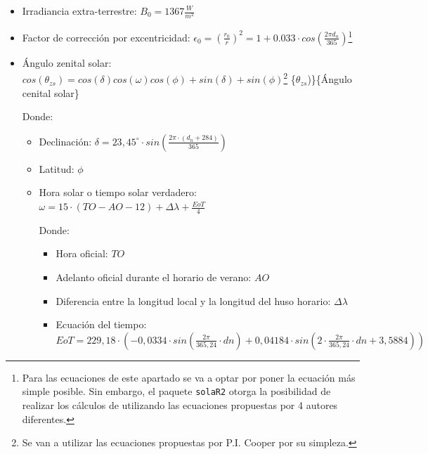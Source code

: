 \begin{itemize}
\item Irradiancia extra-terrestre: \(B_0=1367\frac{W}{m^2}\) 
\item Factor de corrección por excentricidad: \(\epsilon_0=(\frac{r_0}{r})^2=1+0.033\cdot cos(\frac{2\pi d_n}{365})\)\footnote{Para las ecuaciones de este apartado se va a optar por poner la ecuación más simple posible. Sin embargo, el paquete \texttt{solaR2} otorga la posibilidad de realizar los cálculos de utilizando las ecuaciones propuestas por 4 autores diferentes.} 
\item Ángulo zenital solar: \(cos(\theta_{zs})=cos(\delta)cos(\omega)cos(\phi)+sin(\delta)+sin(\phi)\)\footnote{Se van a utilizar las ecuaciones propuestas por P.I. Cooper \cite{Cooper1969} por su simpleza.} \nomenclature[thetazs]\{\(\theta_{zs}\))\}\{Ángulo cenital solar\}

Donde:
\begin{itemize}
\item Declinación: \(\delta =23,45^\circ \cdot sin(\frac{2\pi \cdot (d_n+284)}{365})\) 
\item Latitud: \(\phi\) 
\item Hora solar o tiempo solar verdadero: \(\omega = 15\cdot (TO-AO-12)+\Delta \lambda +\frac{EoT}{4}\) 

Donde:
\begin{itemize}
\item Hora oficial: \(TO\) 
\item Adelanto oficial durante el horario de verano: \(AO\) 
\item Diferencia entre la longitud local y la longitud del huso horario: \(\Delta \lambda\) 
\item Ecuación del tiempo: \(EoT=229,18\cdot (-0,0334\cdot sin(\frac{2\pi}{365,24}\cdot dn)+0,04184\cdot sin(2\cdot \frac{2\pi}{365,24}\cdot dn+3,5884))\) 
\end{itemize}
\end{itemize}
\end{itemize}


